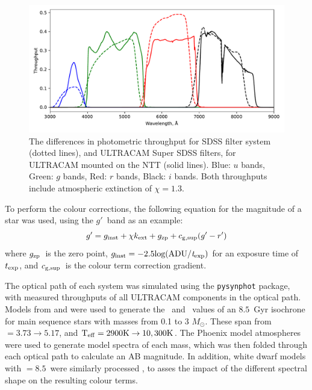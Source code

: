 \begin{figure}
    \centering
    \includegraphics[width=\columnwidth]{figures/three_cvs_with_weird_colours/GeneralFigs/bandpass_diffs_SDSS_dots_UCAMNTT_solid.pdf}
    \caption{The differences in photometric throughput for SDSS filter system (dotted lines), and ULTRACAM Super SDSS filters, for ULTRACAM mounted on the NTT (solid lines). Blue: $u$ bands, Green: $g$ bands, Red: $r$ bands, Black: $i$ bands. Both throughputs include atmospheric extinction of $\chi = 1.3$.}
    \label{fig:sdss vs super filters}
\end{figure}


To perform the colour corrections, the following equation for the magnitude of a star was used, using the $g'$\ band as an example:
\begin{equation}
    \label{eqn:gen magnitudes}
    g' = g_{\rm inst} + \chi k_{\rm ext} + g_{\rm zp} + c_{\rm g, sup}(g'-r') 
\end{equation}
where $g_{\rm zp}$\ is the zero point, $g_{\rm inst} = -2.5 \rm log(ADU/{\it t}_{\rm exp})$
for an exposure time of $t_{\rm exp}$, and $c_{\rm g, sup}$\ is the colour term correction gradient. 

The optical path of each system was simulated using the \texttt{pysynphot} package, with measured throughputs of all ULTRACAM components in the optical path. Models from \citet{Dotter2016} and \citet{Choi2016} were used to generate the \teff\ and \logg\ values of an $8.5$\ Gyr isochrone for main sequence stars with masses from 0.1 to 3 $M_\odot$. These span from \logg $= 3.73 \to 5.17$, and $\rm{T_{eff}} = 2900K \to 10,300K$. The Phoenix model atmospheres \citep{allard2012} were used to generate model spectra of each mass, which was then folded through each optical path to calculate an AB magnitude. In addition, white dwarf models with \logg$=8.5$\ were similarly processed \citep{koester2010, tremblay2009}, to asses the impact of the different spectral shape on the resulting colour terms.

